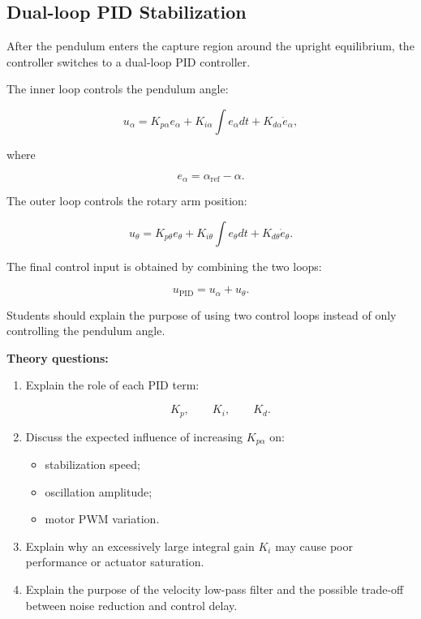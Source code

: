 \documentclass[11pt,a4paper]{article}
\begin{document}

\subsection{Dual-loop PID Stabilization}

After the pendulum enters the capture region around the upright equilibrium,
the controller switches to a dual-loop PID controller.

The inner loop controls the pendulum angle:

\[
u_{\alpha}
=
K_{p\alpha}e_{\alpha}
+
K_{i\alpha}\int e_{\alpha}dt
+
K_{d\alpha}\dot{e}_{\alpha},
\]

where

\[
e_{\alpha}=\alpha_{\mathrm{ref}}-\alpha .
\]

The outer loop controls the rotary arm position:

\[
u_{\theta}
=
K_{p\theta}e_{\theta}
+
K_{i\theta}\int e_{\theta}dt
+
K_{d\theta}\dot{e}_{\theta}.
\]

The final control input is obtained by combining the two loops:

\[
u_{\mathrm{PID}}=u_{\alpha}+u_{\theta}.
\]

Students should explain the purpose of using two control loops instead of
only controlling the pendulum angle.

\vspace{0.2cm}

\textbf{Theory questions:}

\begin{enumerate}[label=(\alph*),leftmargin=0.8cm]

\item Explain the role of each PID term:

\[
K_p,\qquad K_i,\qquad K_d .
\]

\item Discuss the expected influence of increasing $K_{p\alpha}$ on:
\begin{itemize}
    \item stabilization speed;
    \item oscillation amplitude;
    \item motor PWM variation.
\end{itemize}

\item Explain why an excessively large integral gain $K_i$ may cause poor
performance or actuator saturation.

\item Explain the purpose of the velocity low-pass filter and the possible
trade-off between noise reduction and control delay.

\end{enumerate}
\end{document}
